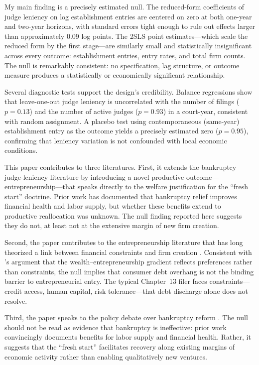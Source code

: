 \documentclass[12pt]{article}
\begin{document}
My main finding is a precisely estimated null. The reduced-form coefficients of judge leniency on log establishment entries are centered on zero at both one-year and two-year horizons, with standard errors tight enough to rule out effects larger than approximately 0.09 log points. The 2SLS point estimates---which scale the reduced form by the first stage---are similarly small and statistically insignificant across every outcome: establishment entries, entry rates, and total firm counts. The null is remarkably consistent: no specification, lag structure, or outcome measure produces a statistically or economically significant relationship.

Several diagnostic tests support the design's credibility. Balance regressions show that leave-one-out judge leniency is uncorrelated with the number of filings ($p=0.13$) and the number of active judges ($p=0.93$) in a court-year, consistent with random assignment. A placebo test using contemporaneous (same-year) establishment entry as the outcome yields a precisely estimated zero ($p=0.95$), confirming that leniency variation is not confounded with local economic conditions.

This paper contributes to three literatures. First, it extends the bankruptcy judge-leniency literature \citep{dobbie2015, dobbie2017, bernstein2019} by introducing a novel productive outcome---entrepreneurship---that speaks directly to the welfare justification for the ``fresh start'' doctrine. Prior work has documented that bankruptcy relief improves financial health and labor supply, but whether these benefits extend to productive reallocation was unknown. The null finding reported here suggests they do not, at least not at the extensive margin of new firm creation.

Second, the paper contributes to the entrepreneurship literature that has long theorized a link between financial constraints and firm creation \citep{evans1989, hurst2004, hombert2020}. Consistent with \citet{hurst2004}'s argument that the wealth--entrepreneurship gradient reflects preferences rather than constraints, the null implies that consumer debt overhang is not the binding barrier to entrepreneurial entry. The typical Chapter~13 filer faces constraints---credit access, human capital, risk tolerance---that debt discharge alone does not resolve.

Third, the paper speaks to the policy debate over bankruptcy reform \citep{white2007, skeel2014}. The null should not be read as evidence that bankruptcy is ineffective: prior work convincingly documents benefits for labor supply and financial health. Rather, it suggests that the ``fresh start'' facilitates recovery along existing margins of economic activity rather than enabling qualitatively new ventures.
\end{document}
